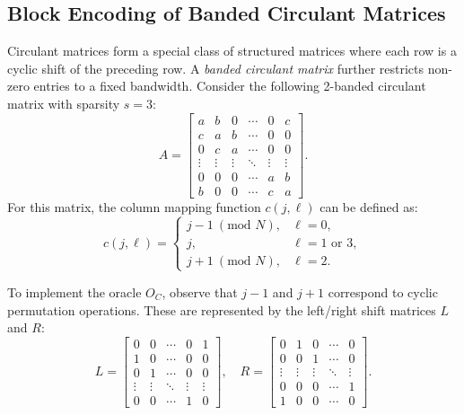 \documentclass{article}
\begin{document}
\subsection{Block Encoding of Banded Circulant Matrices}\label{sec:banded_circulant}

Circulant matrices form a special class of structured matrices where each row is a cyclic shift of the preceding row. A \emph{banded circulant matrix} further restricts non-zero entries to a fixed bandwidth. Consider the following 2-banded circulant matrix with sparsity $s=3$:
$$
A =
\begin{bmatrix}
a & b & 0 & \cdots & 0 & c \\
c & a & b & \cdots & 0 & 0 \\
0 & c & a & \cdots & 0 & 0 \\
\vdots & \vdots & \vdots & \ddots & \vdots & \vdots \\
0 & 0 & 0 & \cdots & a & b \\
b & 0 & 0 & \cdots & c & a
\end{bmatrix}.\label{eq:example_circulant_matrix}
$$
For this matrix, the column mapping function $c(j, \ell)$ can be defined as:
$$
c(j, \ell) =
\begin{cases}
j-1 \ (\text{mod } N), & \ell = 0, \\
j, & \ell = 1 \text{ or } 3, \\
j+1 \ (\text{mod } N), & \ell = 2.
\end{cases}\label{eq:equation13}
$$

To implement the oracle $O_C$, observe that $j-1$ and $j+1$ correspond to cyclic permutation operations. These are represented by the left/right shift matrices $L$ and $R$:
$$
L =
\begin{bmatrix}
0 & 0 & \cdots & 0 & 1 \\
1 & 0 & \cdots & 0 & 0 \\
0 & 1 & \cdots & 0 & 0 \\
\vdots & \vdots & \ddots & \vdots & \vdots \\
0 & 0 & \cdots & 1 & 0
\end{bmatrix}, \quad
R =
\begin{bmatrix}
0 & 1 & 0 & \cdots & 0 \\
0 & 0 & 1 & \cdots & 0 \\
\vdots & \vdots & \vdots & \ddots & \vdots \\
0 & 0 & 0 & \cdots & 1 \\
1 & 0 & 0 & \cdots & 0
\end{bmatrix}.\label{eq:equation14}
$$
\end{document}
